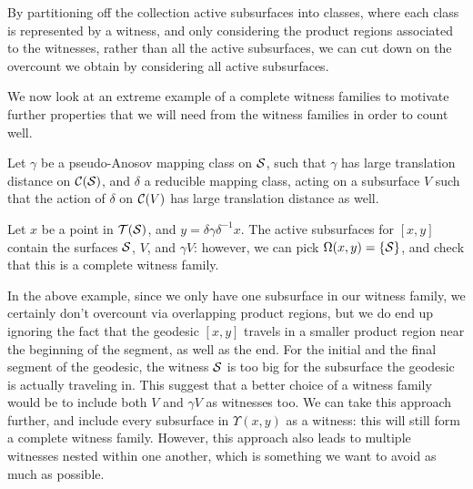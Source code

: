 By partitioning off the collection active subsurfaces into classes, where each class is represented by a witness, and only considering the product regions associated to the witnesses, rather than all the active subsurfaces, we can cut down on the overcount we obtain by considering all active subsurfaces.

We now look at an extreme example of a complete witness families to motivate further properties that we will need from the witness families in order to count well.

\begin{example}
  \label{ex:uninsulated}
  Let $\gamma$ be a pseudo-Anosov mapping class on $\mathcal{S}$, such that $\gamma$ has large translation distance on $\mathcal{C}(\mathcal{S})$, and $\delta$ a reducible mapping class, acting on a subsurface $V$ such that the action of $\delta$ on $\mathcal{C}(V)$ has large translation distance as well.

  Let $x$ be a point in $\mathcal{T}(\mathcal{S})$, and $y = \delta \gamma \delta^{-1} x$.
  The active subsurfaces for $[x, y]$ contain the surfaces $\mathcal{S}$, $V$, and $\gamma V$: however, we can pick $\Omega(x,y) = \left\{ \mathcal{S} \right\}$, and check that this is a complete witness family.
\end{example}

  In the above example, since we only have one subsurface in our witness family, we certainly don't overcount via overlapping product regions, but we do end up ignoring the fact that the geodesic $[x,y]$ travels in a smaller product region near the beginning of the segment, as well as the end.
  For the initial and the final segment of the geodesic, the witness $\mathcal{S}$ is too big for the subsurface the geodesic is actually traveling in.
  This suggest that a better choice of a witness family would be to include both $V$ and $\gamma V$ as witnesses too.
  We can take this approach further, and include every subsurface in $\Upsilon(x,y)$ as a witness: this will still form a complete witness family.
  However, this approach also leads to multiple witnesses nested within one another, which is something we want to avoid as much as possible.

